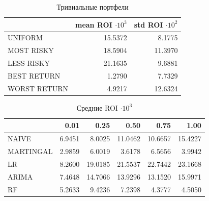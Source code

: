 \documentclass{beamer}
\begin{document}
\begin{frame}
    \frametitle{}
    \begin{table}[H]
        \caption{Тривиальные портфели}
        \label{tab:trivial_rois}
        \begin{tabular}{lrr}
            \toprule
            & mean ROI $\cdot 10^3$ & std ROI $\cdot 10^2$ \\
            \midrule
            UNIFORM & 15.5372 & 8.1775 \\
            MOST RISKY & 18.5904 & 11.3970 \\
            LESS RISKY & 21.1635 & 9.6881 \\
            BEST RETURN & 1.2790 & 7.7329 \\
            WORST RETURN & 4.9217 & 12.6324 \\
            \bottomrule
        \end{tabular}
    \end{table}
\end{frame}

\begin{frame}
    \begin{table}[H]
        \caption{Средние ROI $\cdot 10^3$}
        \label{tab:roi_mean}
        \begin{tabular}{lrrrrr}
            \toprule
            &  0.01 &  0.25 &  0.50 &  0.75 &  1.00 \\
            \midrule
            NAIVE & 6.9451 & 8.0025 & 11.0462 & 10.6657 & 15.4227 \\
            MARTINGAL & 2.9859 & 6.0019 & 3.6178 & 6.5656 & 3.9942 \\
            LR & 8.2600 & 19.0185 & 21.5537 & 22.7442 & 23.1668 \\
            ARIMA & 7.4648 & 14.7066 & 13.9296 & 13.1520 & 15.9971 \\
            RF & 5.2633 & 9.4236 & 7.2398 & 4.3777 & 4.5050 \\
            \bottomrule
        \end{tabular}
    \end{table}
\end{frame}
\end{document}
